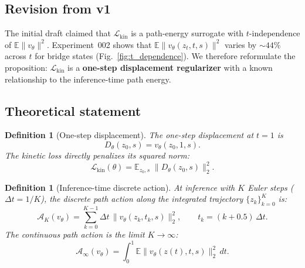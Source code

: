 \documentclass[letterpaper]{article}
\newtheorem{definition}[proposition]{Definition}
\newcommand{\E}{\mathbb{E}}
\newcommand{\cA}{\mathcal{A}}
\newcommand{\cL}{\mathcal{L}}
\begin{document}
\subsection{Revision from v1}
The initial draft claimed that $\cL_{\text{kin}}$ is a path-energy surrogate
with $t$-independence of $\E\|v_\theta\|^2$.
Experiment~002 shows that $\E\|v_\theta(z_t,t,s)\|^2$ varies by $\sim 44\%$
across $t$ for bridge states (Fig.~\ref{fig:t_dependence}).
We therefore reformulate the proposition: $\cL_{\text{kin}}$ is a
\textbf{one-step displacement regularizer} with a known relationship to
the inference-time path energy.

\subsection{Theoretical statement}

\begin{definition}[One-step displacement]
The one-step displacement at $t=1$ is
\begin{equation}
    D_\theta(z_0, s) = v_\theta(z_0, 1, s).
\end{equation}
The kinetic loss directly penalizes its squared norm:
\begin{equation}
    \cL_{\text{kin}}(\theta) = \E_{z_0, s}\; \bigl\| D_\theta(z_0, s) \bigr\|_2^2.
\end{equation}
\end{definition}

\begin{definition}[Inference-time discrete action]
\label{def:discrete_action}
At inference with $K$ Euler steps ($\Delta t = 1/K$), the discrete path
action along the integrated trajectory $\{z_k\}_{k=0}^K$ is:
\begin{equation}
    \cA_K(v_\theta) = \sum_{k=0}^{K-1} \Delta t \,
    \bigl\| v_\theta(z_k, t_k, s) \bigr\|_2^2,
    \qquad t_k = (k+0.5)\,\Delta t.
    \label{eq:discrete_action}
\end{equation}
The continuous path action is the limit $K\to\infty$:
\begin{equation}
    \cA_\infty(v_\theta) = \int_0^1 \E\bigl\| v_\theta(z(t), t, s) \bigr\|_2^2\, dt.
    \label{eq:continuous_action}
\end{equation}
\end{definition}
\end{document}
